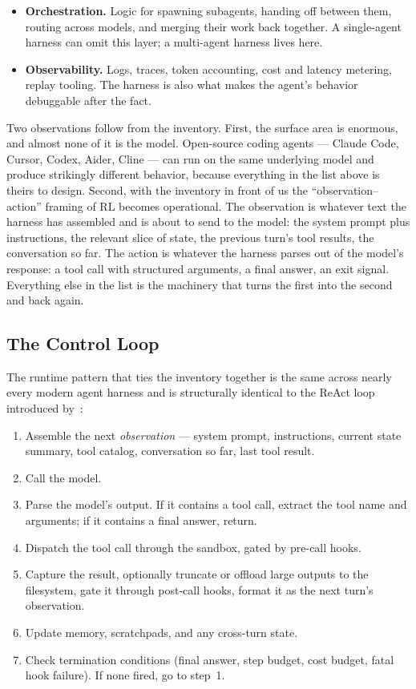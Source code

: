 \begin{itemize}[leftmargin=1.5em,itemsep=0.3em]
\item \textbf{Orchestration.} Logic for spawning subagents,
  handing off between them, routing across models, and merging
  their work back together. A single-agent harness can omit this
  layer; a multi-agent harness lives here.

\item \textbf{Observability.} Logs, traces, token accounting,
  cost and latency metering, replay tooling. The harness is also
  what makes the agent's behavior debuggable after the fact.

\end{itemize}

\noindent
Two observations follow from the inventory. First, the surface
area is enormous, and almost none of it is the model. Open-source
coding agents --- Claude Code, Cursor, Codex, Aider, Cline ---
can run on the same underlying model and produce strikingly
different behavior, because everything in the list above is theirs
to design. Second, with the inventory in front of us the
``observation--action'' framing of RL becomes operational. The
observation is whatever text the harness has assembled and is
about to send to the model: the system prompt plus instructions,
the relevant slice of state, the previous turn's tool results,
the conversation so far. The action is whatever the harness
parses out of the model's response: a tool call with structured
arguments, a final answer, an exit signal. Everything else in the
list is the machinery that turns the first into the second and
back again.

\subsection{The Control Loop}
\label{sec:agents-harness-loop}

The runtime pattern that ties the inventory together is the same
across nearly every modern agent harness and is structurally
identical to the ReAct loop introduced
by~\citet{yao2023react}:

\begin{enumerate}[label=(\arabic*),leftmargin=2em,itemsep=0.2em]
\item Assemble the next \emph{observation} --- system prompt,
  instructions, current state summary, tool catalog, conversation
  so far, last tool result.
\item Call the model.
\item Parse the model's output. If it contains a tool call,
  extract the tool name and arguments; if it contains a final
  answer, return.
\item Dispatch the tool call through the sandbox, gated by
  pre-call hooks.
\item Capture the result, optionally truncate or offload large
  outputs to the filesystem, gate it through post-call hooks,
  format it as the next turn's observation.
\item Update memory, scratchpads, and any cross-turn state.
\item Check termination conditions (final answer, step budget,
  cost budget, fatal hook failure). If none fired, go to step~1.
\end{enumerate}

